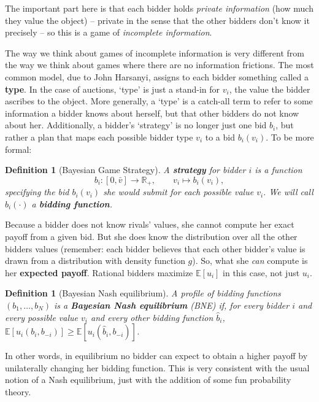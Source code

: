 \documentclass[12pt]{article}
\newcommand{\bbR}{\mathbb{R}}
\newcommand{\bbE}{\mathbb{E}}
\newtheorem{definition}[theorem]{Definition}
\newcommand{\vbar}{\bar{v}}
\theoremstyle{definition}
\theoremstyle{remark}
\theoremstyle{plain}                          %
\begin{document}
The important part here is that each bidder holds \emph{private information} (how much they value the object) -- private in the sense that the other bidders don't know it precisely -- so this is a game of \textit{incomplete information}.

The way we think about games of incomplete information is very different from the way we think about games where there are no information frictions. The most common model, due to John Harsanyi, assigns to each bidder something called a \textbf{type}. In the case of auctions, `type' is just a stand-in for $v_i$, the value the bidder ascribes to the object. More generally, a `type' is a catch-all term to refer to some information a bidder knows about herself, but that other bidders do not know about her. Additionally, a bidder's `strategy' is no longer just one bid $b_i$, but rather a plan that maps each possible bidder type $v_i$ to a bid $b_i(v_i)$. To be more formal:

\begin{definition}[Bayesian Game Strategy]
A \textbf{strategy} for bidder $i$ is a function
\[
  b_i : [0, \vbar] \longrightarrow \bbR_{+}, \qquad v_i \longmapsto b_i(v_i),
\]
specifying the bid $b_i(v_i)$ she would submit for each possible value $v_i$. We will call $b_i(\cdot)$ a \textbf{bidding function}.
\end{definition}

Because a bidder does not know rivals' values, she cannot compute her exact payoff from a given bid. But she does know the distribution over all the other bidders values (remember: each bidder believes that each other bidder's value is drawn from a distribution with density function $g$). So, what she \emph{can} compute is her \textbf{expected payoff}. Rational bidders maximize $\bbE[u_i]$ in this case, not just $u_i$.

\begin{definition}[Bayesian Nash equilibrium]\label{def:bne}
A profile of bidding functions $(b_1, \dots, b_N)$ is a \textbf{Bayesian Nash
equilibrium} (BNE) if, for every bidder $i$ and every possible value $v_i$ and every other bidding function $\hat b_i$, $\bbE[u_i(b_i,b_{-i})] \geq \bbE[u_i(\hat b_i,b_{-i})]$.
\end{definition}

In other words, in equilibrium no bidder can expect to obtain a higher payoff by unilaterally changing her bidding function. This is very consistent with the usual notion of a Nash equilibrium, just with the addition of some fun probability theory.
\end{document}
